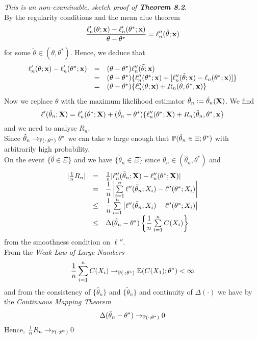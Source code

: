\documentclass[11pt,a4paper]{article}
\begin{document}
\textit{This is an non-examinable, sketch proof of \textbf{Theorem 8.2}}.\\
By the regularity conditions and the mean alue theorem
$$\frac{\ell_n'(\theta;\textbf{x})-\ell'_n(\theta^*;\textbf{x})}{\theta-\theta^*}=\ell''_n(\tilde{\theta};\textbf{x})$$
for some $\tilde{\theta}\in(\theta,\theta^*)$. Hence, we deduce that
\[\begin{array}{rcl}
\ell'_n(\theta;\textbf{x})-\ell_n'(\theta^*;\textbf{x})&=&(\theta-\theta^*)\ell''_n(\tilde{\theta};\textbf{x})\\
&=&(\theta-\theta^*)\{\ell''_n(\theta^*;\textbf{x})+[\ell''_n(\tilde{\theta};\textbf{x})-\ell_n(\theta^*;\textbf{x})]\}\\
&=&(\theta-\theta^*)\{\ell''_n(\theta;\textbf{x})+R_n(\theta,\theta^*,\textbf{x})\}
\end{array}\]
Now we replace $\theta$ with the maximum likelihood estimator $\hat{\theta}_n:=\hat{\theta}_n(\textbf{X})$. We find
$$\ell'(\hat{\theta}_n;\textbf{X})=\ell'_n(\theta^*;\textbf{X})+(\hat{\theta}_n-\theta^*)\{\ell''_n(\theta^*;\textbf{X})+R_n(\hat{\theta}_n,\theta^*,\textbf{x}\}$$
and we need to analyse $R_n$.\\
Since $\hat{\theta}_n\to_{\mathbb{P}(\cdot;\theta^*)}\theta^*$ we can take $n$ large enough that $\mathbb{P}(\hat{\theta}_n\in\Xi;\theta^*)$ with arbitrarily high probability.\\
On the event $\{\hat{\theta}\in\Xi\}$ and we have $\{\tilde{\theta}_n\in\Xi\}$ since $\tilde{\theta}_n\in(\hat{\theta}_n,\theta^*)$ and
\[\begin{array}{rcl}
|\frac{1}{n}R_n|&=&\frac{1}{n}|\ell''_n(\tilde{\theta}_n;\textbf{X})-\ell_n''(\theta^*;\textbf{X})|\\
&=&\dfrac{1}{n}\left|\sum\limits_{i=1}^n\ell''(\tilde{\theta}_n;X_i)-\ell''(\theta^*;X_i)\right|\\
&\leq&\dfrac{1}{n}\sum\limits_{i=1}^n\left|\ell''(\tilde{\theta}_n;X_i)-\ell''(\theta^*;X_i)\right|\\
&\leq&\Delta(\tilde{\theta}_n-\theta^*)\left\{\dfrac{1}{n}\sum\limits_{i=1}^nC(X_i)\right\}
\end{array}\]
from the smoothness condition on $\ell''$.\\
From the \textit{Weak Law of Large Numbers}
$$\frac{1}{n}\sum_{i=1}^nC(X_i)\to_{\mathbb{P}(\cdot;\theta^*)}\mathbb{E}(C(X_1);\theta^*)<\infty$$
and from the consistency of $\{\hat{\theta}_n\}$ and $\{\tilde{\theta}_n\}$ and continuity of $\Delta(\cdot)$ we have by the \textit{Continuous Mapping Theorem}
$$\Delta(\tilde{\theta}_n-\theta^*)\to_{\mathbb{P}(\cdot;\theta^*)}0$$
Hence, $\frac{1}{n}R_n\to_{\mathbb{P}(\cdot;\theta^*)}0$\proved
\end{document}
